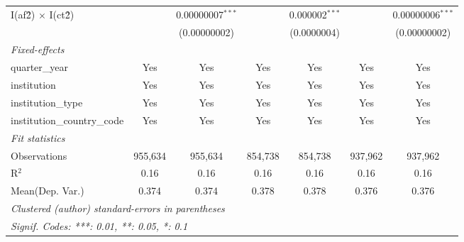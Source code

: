 \begin{tabular}{lcccccc}
   I(af\^2) $\times$ I(ct\^2)         &               & 0.00000007$^{***}$ &               & 0.000002$^{***}$ &               & 0.00000006$^{***}$\\   
                                      &               & (0.00000002)       &               & (0.0000004)      &               & (0.00000002)\\   
   \midrule
   \emph{Fixed-effects}\\
   quarter\_year                      & Yes           & Yes                & Yes           & Yes              & Yes           & Yes\\  
   institution                        & Yes           & Yes                & Yes           & Yes              & Yes           & Yes\\  
   institution\_type                  & Yes           & Yes                & Yes           & Yes              & Yes           & Yes\\  
   institution\_country\_code         & Yes           & Yes                & Yes           & Yes              & Yes           & Yes\\  
   \midrule
   \emph{Fit statistics}\\
   Observations                       & 955,634       & 955,634            & 854,738       & 854,738          & 937,962       & 937,962\\  
   R$^2$                              & 0.16          & 0.16               & 0.16          & 0.16             & 0.16          & 0.16\\  
Mean(Dep. Var.) & 0.374 & 0.374 & 0.378 & 0.378 & 0.376 & 0.376 \\
   \midrule \midrule
   \multicolumn{7}{l}{\emph{Clustered (author) standard-errors in parentheses}}\\
   \multicolumn{7}{l}{\emph{Signif. Codes: ***: 0.01, **: 0.05, *: 0.1}}\\
\end{tabular}
\par\endgroup
